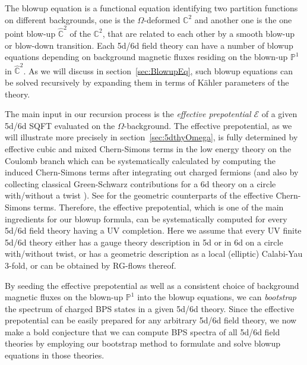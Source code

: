 The blowup equation is a functional equation identifying two partition functions on different backgrounds, one is the $\Omega$-deformed $\mathbb{C}^2$ and another one is the one point blow-up $\hat{\mathbb{C}}^2$ of the $\mathbb{C}^2$, that are related to each other by a smooth blow-up or blow-down transition. Each 5d/6d field theory can have a number of blowup equations depending on background magnetic fluxes residing on the blown-up $\mathbb{P}^1$ in $\hat{\mathbb{C}}^2$. As we will discuss in section~\ref{sec:BlowupEq}, such blowup equations can be solved recursively by expanding them in terms of K\"ahler parameters of the theory.

The main input in our recursion process is the {\it effective prepotential $\mathcal{E}$} of a given 5d/6d SQFT evaluated on the $\Omega$-background. The effective prepotential, as we will illustrate more precisely in section~\ref{sec:5dthyOmega}, is fully determined by effective cubic and mixed Chern-Simons terms in the low energy theory on the Coulomb branch which can be systematically calculated by computing the induced Chern-Simons terms after integrating out charged fermions \cite{Witten:1996qb} (and also by collecting classical Green-Schwarz contributions for a 6d theory on a circle with/without a twist \cite{Bhardwaj:2019fzv}). See \cite{Maldacena:1997de,Katz:2020ewz} for the geometric counterparts of the effective Chern-Simons terms. Therefore, the effective prepotential, which is one of the main ingredients for our blowup formula, can be systematically computed for every 5d/6d field theory having a UV completion. Here we assume that every UV finite 5d/6d theory either has a gauge theory description in 5d or in 6d on a circle with/without twist, or has a geometric description as a local (elliptic) Calabi-Yau 3-fold, or can be obtained by RG-flows thereof.

By seeding the effective prepotential as well as a consistent choice of background magnetic fluxes on the blown-up $\mathbb{P}^1$ into the blowup equations, we can {\it bootstrap} the spectrum of charged BPS states in a given 5d/6d theory. Since the effective prepotential can be easily prepared for any arbitrary 5d/6d field theory, we now make a bold conjecture that we can compute BPS spectra of all 5d/6d field theories by employing our bootstrap method to formulate and solve blowup equations in those theories.

